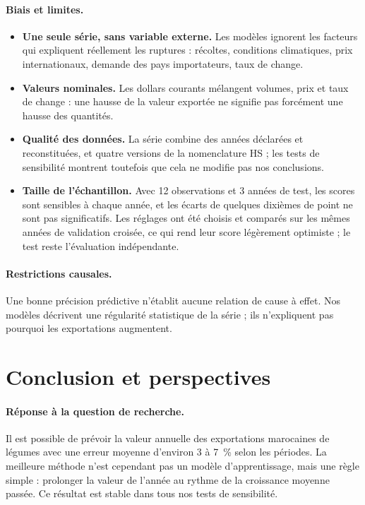 \documentclass[11pt,a4paper]{article}
\begin{document}
\paragraph{Biais et limites.}
\begin{itemize}
\item \textbf{Une seule série, sans variable externe.} Les modèles ignorent les facteurs qui expliquent réellement les ruptures : récoltes, conditions climatiques, prix internationaux, demande des pays importateurs, taux de change.
\item \textbf{Valeurs nominales.} Les dollars courants mélangent volumes, prix et taux de change : une hausse de la valeur exportée ne signifie pas forcément une hausse des quantités.
\item \textbf{Qualité des données.} La série combine des années déclarées et reconstituées, et quatre versions de la nomenclature HS ; les tests de sensibilité montrent toutefois que cela ne modifie pas nos conclusions.
\item \textbf{Taille de l'échantillon.} Avec 12 observations et 3 années de test, les scores sont sensibles à chaque année, et les écarts de quelques dixièmes de point ne sont pas significatifs. Les réglages ont été choisis et comparés sur les mêmes années de validation croisée, ce qui rend leur score légèrement optimiste ; le test reste l'évaluation indépendante.
\end{itemize}

\paragraph{Restrictions causales.} Une bonne précision prédictive n'établit aucune relation de cause à effet. Nos modèles décrivent une régularité statistique de la série ; ils n'expliquent pas pourquoi les exportations augmentent.

\section{Conclusion et perspectives}\label{sec:conclusion}

\paragraph{Réponse à la question de recherche.} Il est possible de prévoir la valeur annuelle des exportations marocaines de légumes avec une erreur moyenne d'environ 3 à 7~\% selon les périodes. La meilleure méthode n'est cependant pas un modèle d'apprentissage, mais une règle simple : prolonger la valeur de l'année au rythme de la croissance moyenne passée. Ce résultat est stable dans tous nos tests de sensibilité.
\end{document}

